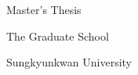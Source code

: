 
\begin{titlepage}
\centering
{\fontsize{16}{20}\selectfont Master's Thesis\par}
\vspace{1.0cm}
{\fontsize{22}{27}\selectfont\bfseries\thesistitle\par}
\vspace{.7cm}
{\fontsize{14}{21}\selectfont\thesistitlekr\par}
\vspace{1.0cm}
{\fontsize{16}{20}\selectfont\thesisauthor\par}
\vspace{.2cm}
{\large\thesisauthorkr\par}
\vfill
{\fontsize{16}{22}\selectfont The Graduate School\par
Sungkyunkwan University\par
\thesisdepartment\par}
\vspace{.8cm}
{\fontsize{16}{20}\selectfont\thesisyear\par}
\end{titlepage}
